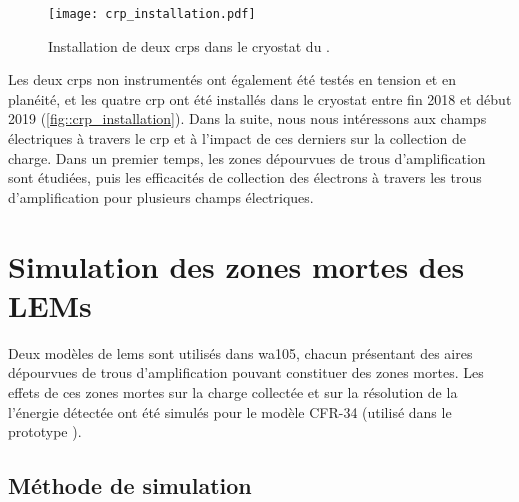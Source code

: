 
      \begin{figure}
        \centering
        \texttt{[image: crp\_installation.pdf]}
        \caption[Installation de deux CRPs dans le cryostat du \SSS{}]{\label{fig::crp_installation}Installation de deux \glspl{crp} dans le cryostat du \SSS{}.}
      \end{figure}

      Les deux \glspl{crp} non instrumentés ont également été testés en tension et en planéité, et les quatre \gls{crp} ont été installés dans le cryostat entre fin 2018 et début 2019 (\autoref{fig::crp_installation}). Dans la suite, nous nous intéressons aux champs électriques à travers le \gls{crp} et à l'impact de ces derniers sur la collection de charge. Dans un premier temps, les zones dépourvues de trous d'amplification sont étudiées, puis les efficacités de collection des électrons à travers les trous d'amplification pour plusieurs champs électriques.
        
  \section{Simulation des zones mortes des LEMs}\label{sec::dead_zones}
    
    Deux modèles de \glspl{lem} sont utilisés dans \gls{wa105}, chacun présentant des aires dépourvues de trous d'amplification pouvant constituer des zones mortes. Les effets de ces zones mortes sur la charge collectée et sur la résolution de la l'énergie détectée ont été simulés pour le modèle CFR-34 (utilisé dans le prototype \TOO{}). %
        
    \subsection{Méthode de simulation}
        
